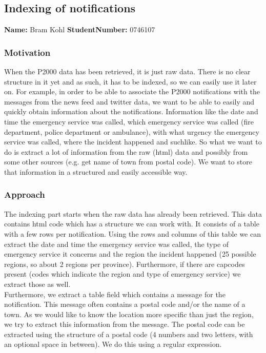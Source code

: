 \subsection{Indexing of notifications}
\textbf{Name:} Bram Kohl \indent \textbf{StudentNumber:} 0746107

\subsubsection*{Motivation}
When the P2000 data has been retrieved, it is just raw data. There is no clear structure in it yet and as such, it has to be indexed, so we can easily use it later on. For example, in order to be able to associate the P2000 notifications with the messages from the news feed and twitter data, we want to be able to easily and quickly obtain information about the notifications. Information like the date and time the emergency service was called, which emergency service was called (fire department, police department or ambulance), with what urgency the emergency service was called, where the incident happened and suchlike. So what we want to do is extract a lot of information from the raw (html) data and possibly from some other sources (e.g. get name of town from postal code). We want to store that information in a structured and easily accessible way.
\subsubsection*{Approach}
The indexing part starts when the raw data has already been retrieved. This data contains html code which has a structure we can work with. It consists of a table with a few rows per notification. Using the rows and columns of this table we can extract the date and time the emergency service was called, the type of emergency service it concerns and the region the incident happened (25 possible regions, so about 2 regions per province). Furthermore, if there are capcodes present (codes which indicate the region and type of emergency service) we extract those as well.\\

Furthermore, we extract a table field which contains a message for the notification. This message often contains a postal code and/or the name of a town. As we would like to know the location more specific than just the region, we try to extract this information from the message.
The postal code can be extracted using the structure of a postal code (4 numbers and two letters, with an optional space in between). We do this using a regular expression.\\

